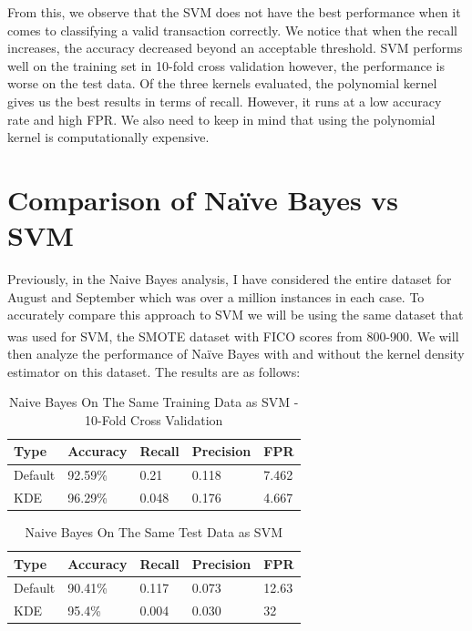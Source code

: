 \documentclass[conference]{IEEEtran}
\begin{document}
\break
From this, we observe that the SVM does not have the best performance when it comes to classifying a valid transaction correctly. We notice that when the recall increases, the accuracy decreased beyond an acceptable threshold. SVM performs well on the training set in 10-fold cross validation however, the performance is worse on the test data. Of the three kernels evaluated, the polynomial kernel gives us the best results in terms of recall. However, it runs at a low accuracy rate and high FPR. We also need to keep in mind that using the polynomial kernel is computationally expensive.
 
\section{Comparison of Naïve Bayes vs SVM}
 
Previously, in the Naive Bayes analysis, I have considered the entire dataset for August and September which was over a million instances in each case. To accurately compare this approach to SVM we will be using the same dataset that was used for SVM, the SMOTE dataset with FICO\textsuperscript{\textregistered} scores from 800-900. We will then analyze the performance of Naïve Bayes with and without the kernel density estimator on this dataset. The results are as follows:


 \begin{table}[!h]
\caption{Naive Bayes On The Same Training Data as SVM - 10-Fold Cross Validation}
\begin{center}
\begin{tabular}{ | l | l | l | l | l |}
\hline
Type & Accuracy & Recall & Precision & FPR \\
\hline\hline
Default & 92.59\% & 0.21 & 0.118 & 7.462 \\
\hline
KDE & 96.29\% & 0.048 & 0.176 & 4.667 \\
\hline
\end{tabular}
\end{center}
\end{table}


 \begin{table}[!h]
\caption{Naive Bayes On The Same Test Data as SVM}
\begin{center}
\begin{tabular}{ | l | l | l | l | l |}
\hline
Type & Accuracy & Recall & Precision & FPR \\
\hline\hline
Default & 90.41\% & 0.117 & 0.073 & 12.63 \\
\hline
KDE & 95.4\% & 0.004 & 0.030 & 32 \\
\hline
\end{tabular}
\end{center}
\end{table}
\end{document}

